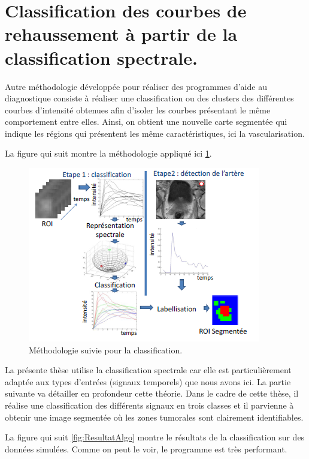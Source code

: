 \section{Classification des courbes de rehaussement à partir de la classification spectrale.}

Autre méthodologie développée pour réaliser des programmes d'aide au diagnostique consiste à réaliser une classification ou des clusters des différentes courbes d'intensité obtenues afin d'isoler les courbes présentant le même comportement entre elles. Ainsi, on obtient une nouvelle carte segmentée qui indique les régions qui présentent les même caractéristiques, ici la vascularisation.

\medskip

La figure qui suit montre la méthodologie appliqué ici \ref{fig:Classif}.
 
\begin{figure}[H]
\centering
    \includegraphics[scale=1,angle=0]{Images/Classif.png}
    \caption{Méthodologie suivie pour la classification.}
    \label{fig:Classif}
\end{figure}

La présente thèse utilise la classification spectrale car elle est particulièrement adaptée aux types d'entrées (signaux temporels) que nous avons ici. La partie suivante va détailler en profondeur cette théorie. Dans le cadre de cette thèse, il réalise une classification des différents signaux en trois classes et il parvienne à obtenir une image segmentée où les zones tumorales sont clairement identifiables.

\medskip

La figure qui suit \ref{fig:ResultatAlgo} montre le résultats de la classification sur des données simulées. Comme on peut le voir, le programme est très performant.


